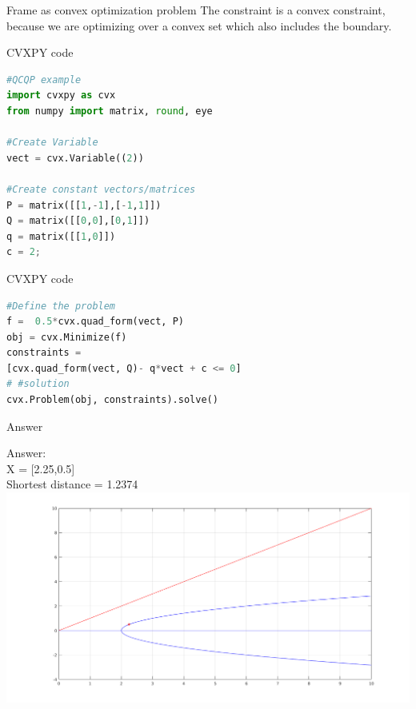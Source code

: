 \documentclass{beamer}
\begin{document}
\begin{frame}{Frame as convex optimization problem}
The constraint is a convex constraint, because we are optimizing over a convex set which also includes the boundary.

\end{frame}

\begin{frame}[fragile]{CVXPY code}

\begin{lstlisting}[language=Python]
#QCQP example
import cvxpy as cvx
from numpy import matrix, round, eye

#Create Variable
vect = cvx.Variable((2))

#Create constant vectors/matrices
P = matrix([[1,-1],[-1,1]])
Q = matrix([[0,0],[0,1]])
q = matrix([[1,0]])
c = 2;
\end{lstlisting}

\end{frame}

\begin{frame}[fragile]{CVXPY code}

\begin{lstlisting}[language=Python]
#Define the problem
f =  0.5*cvx.quad_form(vect, P)
obj = cvx.Minimize(f)
constraints = 
[cvx.quad_form(vect, Q)- q*vect + c <= 0]
# #solution
cvx.Problem(obj, constraints).solve()

\end{lstlisting}

\end{frame}

\begin{frame}[fragile]{Answer}

Answer:
\\
X = [2.25,0.5]\\ 
Shortest distance =  1.2374\\
\includegraphics[scale=0.25]{plot.png}
\end{frame}
\end{document}
